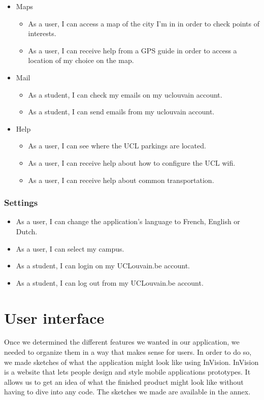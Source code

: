 \documentclass{eplmastersthesis}
\begin{document}
\begin{itemize}
\item Maps
\begin{itemize}
\item As a user, I can access a map of the city I'm in in order to check points of interests.
\item As a user, I can receive help from a GPS guide in order to access a location of my choice on the map.
\end{itemize}
\item Mail
\begin{itemize}
\item As a student, I can check my emails on my uclouvain account.
\item As a student, I can send emails from my uclouvain account.
\end{itemize}
\item{Help}
\begin{itemize}
\item As a user, I can see where the UCL parkings are located.
\item As a user, I can receive help about how to configure the UCL wifi.
\item As a user, I can receive help about common transportation.
\end{itemize}
\end{itemize}

\subsubsection{Settings}

\begin{itemize}
\item As a user, I can change the application's language to French, English or Dutch.
\item As a user, I can select my campus.
\item As a student, I can login on my UCLouvain.be account.
\item As a student, I can log out from my UCLouvain.be account. 
\end{itemize}

\section{User interface}

Once we determined the different features we wanted in our application, we needed to organize them in a way that makes sense for users. In order to do so, we made sketches of what the application might look like using InVision. InVision is a website that lets people design and style mobile applications prototypes. It allows us to get an idea of what the finished product might look like without having to dive into any code. The sketches we made are available in the annex.\\
\end{document}
